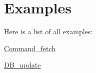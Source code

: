 \section{Examples}
Here is a list of all examples\+:\begin{DoxyCompactItemize}
\item 
\hyperlink{Command_fetch-example}{Command\+\_\+fetch}
\item 
\hyperlink{DB_update-example}{D\+B\+\_\+update}
\end{DoxyCompactItemize}
